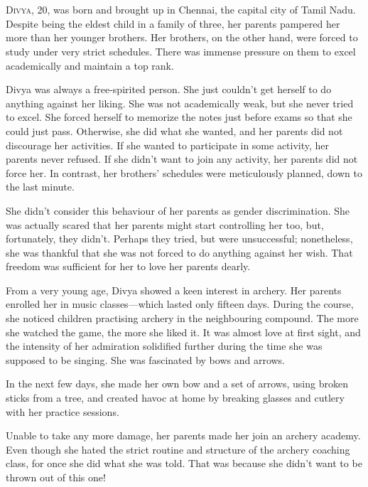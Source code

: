 \chapter{}

\lettrine{D}{ivya}, 20, was born and brought up in Chennai, the capital city of Tamil Nadu.
Despite being the eldest child in a family of three, her parents pampered her more than
her younger brothers. Her brothers, on the other hand, were forced to study under
very strict schedules. There was immense pressure on them to excel academically and maintain a top rank.

Divya was always a free-spirited person. She just couldn't get herself to do
anything against her liking. She was not academically weak, but she never tried to excel. She forced herself to memorize the notes just before exams so
that she could just pass. Otherwise, she did what she wanted, and her parents did
not discourage her activities. If she wanted to participate in some activity,
her parents never refused. If she didn't want to join any activity, her parents
did not force her. In contrast, her brothers' schedules were meticulously planned,
down to the last minute.

She didn't consider this behaviour of her parents as gender discrimination. She
was actually scared that her parents might start controlling her too, but, fortunately,
they didn't. Perhaps they tried, but were unsuccessful; nonetheless, she was thankful
that she was not forced to do anything against her wish. That freedom was sufficient
for her to love her parents dearly.

From a very young age, Divya showed a keen interest in archery. Her parents enrolled
her in music classes—which lasted only fifteen days. During the
course, she noticed children practising archery in the neighbouring compound.
The more she watched the game, the more she liked it. It was almost love at
first sight, and the intensity of her admiration solidified
further during the time she was supposed to be singing. She was fascinated by
bows and arrows.

In the next few days, she made her own bow and a set of arrows, using broken
sticks from a tree, and created havoc at home by breaking glasses and cutlery
with her practice sessions.

Unable to take any more damage, her parents made her
join an archery academy. Even though she hated the strict routine and structure
of the archery coaching class, for once she did what she was told. That was
because she didn't want to be thrown out of this one!

